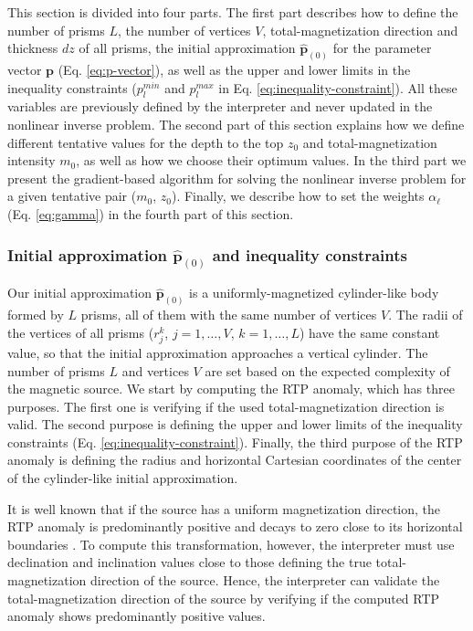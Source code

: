 This section is divided into four parts. The first part describes how to define  
the number of prisms $L$, the number of vertices $V$, total-magnetization 
direction and thickness $dz$ of all prisms, the initial approximation
$\hat{\mathbf{p}}_{(0)}$ for the parameter vector $ \mathbf{p} $ 
(Eq. \ref{eq:p-vector}), as well as the upper and lower limits in the inequality
constraints ($p_{l}^{min}$ and $p_{l}^{max}$ in Eq. \ref{eq:inequality-constraint}). 
All these variables are previously defined by the interpreter and never updated
in the nonlinear inverse problem.
The second part of this section explains how we define different 
tentative values for the depth to the top $z_{0}$ and total-magnetization
intensity $m_{0}$, as well as how we choose their optimum values.
In the third part we present the gradient-based algorithm for solving the nonlinear
inverse problem for a given tentative pair ($m_{0}$, $z_{0}$). 
Finally, we describe how to set the weights $ \alpha_{\ell} $ 
(Eq. \ref{eq:gamma}) in the fourth part of this section.

\subsubsection{Initial approximation $\hat{\mathbf{p}}_{(0)}$ and inequality constraints}

Our initial approximation $\hat{\mathbf{p}}_{(0)}$ is a uniformly-magnetized
cylinder-like body formed by 
$L$ prisms, all of them with the same number of vertices $V$. The radii of the
vertices of all prisms ($r^{k}_{j}$, $j=1,\dots , V$, $k=1,\dots ,L$) have the 
same constant value, so that the initial approximation approaches a vertical
cylinder. 
The number of prisms $L$ and vertices $V$ are set based on the expected complexity 
of the magnetic source.
We start by computing the RTP anomaly, which has three purposes.
The first one is verifying if the used total-magnetization direction is valid.
The second purpose is defining the upper and lower limits of the inequality
constraints (Eq. \ref{eq:inequality-constraint}).
Finally, the third purpose of the RTP anomaly is defining the radius and horizontal
Cartesian coordinates of the center of the cylinder-like initial approximation.

It is well known that if the source has a uniform magnetization direction, 
the RTP anomaly is predominantly positive and decays to zero close to its 
horizontal boundaries \cite[e.g.,][p. 331]{blakely1996}. 
To compute this transformation, however, the interpreter must use declination and
inclination values close to those defining the true total-magnetization direction
of the source. 
Hence, the interpreter can validate the total-magnetization direction of the source 
by verifying if the computed RTP anomaly shows predominantly positive values.


